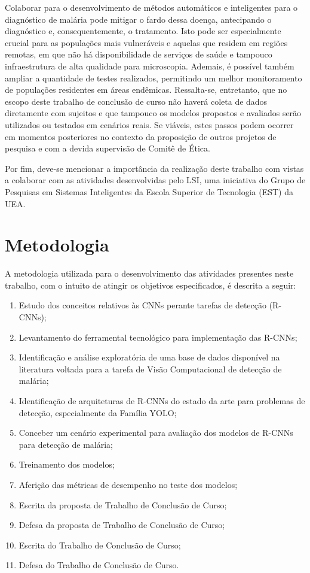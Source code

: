 Colaborar para o desenvolvimento de métodos automáticos e inteligentes para o diagnóstico de malária pode mitigar o fardo dessa doença, antecipando o diagnóstico e, consequentemente, o tratamento. Isto pode ser especialmente crucial para as populações mais vulneráveis e aquelas que residem em regiões remotas, em que não há disponibilidade de serviços de saúde e tampouco infraestrutura de alta qualidade para microscopia. Ademais, é possível também ampliar a quantidade de testes realizados, permitindo um melhor monitoramento de populações residentes em áreas endêmicas. Ressalta-se, entretanto, que no escopo deste trabalho de conclusão de curso não haverá coleta de dados diretamente com sujeitos e que tampouco os modelos propostos e avaliados  serão utilizados ou testados em cenários reais. Se viáveis, estes passos podem ocorrer em momentos posteriores no contexto da proposição de outros projetos de pesquisa e com a devida supervisão de Comitê de Ética.

Por fim, deve-se mencionar a importância da realização deste trabalho com vistas a colaborar com as atividades desenvolvidas pelo LSI, uma iniciativa do Grupo de Pesquisas em Sistemas Inteligentes da Escola Superior de Tecnologia (EST) da UEA.

\section{Metodologia}

A metodologia utilizada para o desenvolvimento das atividades presentes neste trabalho, com o intuito de atingir os objetivos especificados, é descrita a seguir:

\begin{enumerate}
    \item Estudo dos conceitos relativos às CNNs perante tarefas de detecção (R-CNNs);
    \item Levantamento do ferramental tecnológico para implementação das R-CNNs;
    \item Identificação e análise exploratória de uma base de dados disponível na literatura voltada para a tarefa de Visão Computacional de detecção de malária;
    \item Identificação de arquiteturas de R-CNNs do estado da arte para problemas de detecção, especialmente da Família YOLO;
    \item Conceber um cenário experimental para avaliação dos modelos de R-CNNs para detecção de malária;
    \item Treinamento dos modelos;
    \item Aferição das métricas de desempenho no teste dos modelos;
    \item Escrita da proposta de Trabalho de Conclusão de Curso;
    \item Defesa da proposta de Trabalho de Conclusão de Curso;
    \item Escrita do Trabalho de Conclusão de Curso;
    \item Defesa do Trabalho de Conclusão de Curso.
 \end{enumerate}

